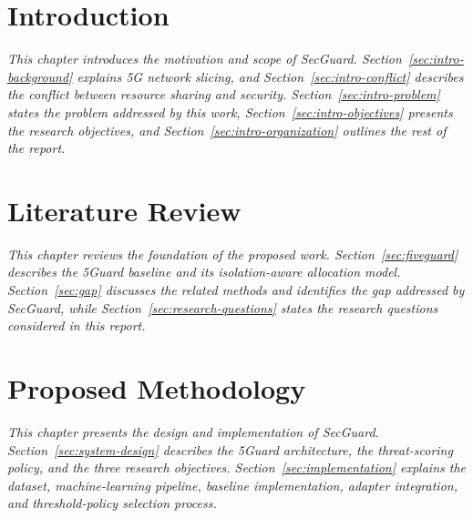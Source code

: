 \documentclass[12pt,phd,times]{pkmthesis}
\begin{document}
\listoftables
\clearpage


\clearpage

\fancyhf{}
\fancyhead[LE]{\bfseries\small{\leftmark}}
\fancyhead[RO]{\bfseries\small{\rightmark}}
\fancyfoot[CE,CO]{\bfseries\thepage}
\setcounter{page}{1}
\renewcommand{\labelenumi}{(\roman{enumi})}

\chapter{Introduction}\label{chap:intro}
\vspace{-1cm}
\emph{This chapter introduces the motivation and scope of SecGuard. Section~\ref{sec:intro-background} explains 5G network slicing, and Section~\ref{sec:intro-conflict} describes the conflict between resource sharing and security. Section~\ref{sec:intro-problem} states the problem addressed by this work, Section~\ref{sec:intro-objectives} presents the research objectives, and Section~\ref{sec:intro-organization} outlines the rest of the report.}


\chapter{Literature Review}\label{chap:literature}
\vspace{-1cm}
\emph{This chapter reviews the foundation of the proposed work. Section~\ref{sec:fiveguard} describes the 5Guard baseline and its isolation-aware allocation model. Section~\ref{sec:gap} discusses the related methods and identifies the gap addressed by SecGuard, while Section~\ref{sec:research-questions} states the research questions considered in this report.}


\chapter{Proposed Methodology}\label{chap:methodology}
\vspace{-1cm}
\emph{This chapter presents the design and implementation of SecGuard. Section~\ref{sec:system-design} describes the 5Guard architecture, the threat-scoring policy, and the three research objectives. Section~\ref{sec:implementation} explains the dataset, machine-learning pipeline, baseline implementation, adapter integration, and threshold-policy selection process.}

\end{document}
